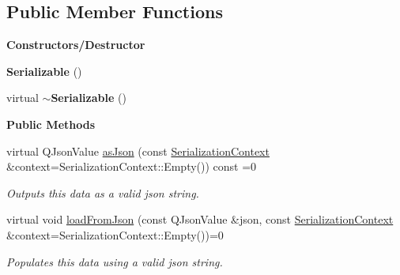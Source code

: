 \subsection*{Public Member Functions}
\begin{Indent}\textbf{ Constructors/\+Destructor}\par
\begin{DoxyCompactItemize}
\item 
\mbox{\label{classrev_1_1_serializable_afd95beffb0785162421c04034372b161}} 
{\bfseries Serializable} ()
\item 
\mbox{\label{classrev_1_1_serializable_a48737a4d5df365ec741a5a304d6990d9}} 
virtual {\bfseries $\sim$\+Serializable} ()
\end{DoxyCompactItemize}
\end{Indent}
\begin{Indent}\textbf{ Public Methods}\par
\begin{DoxyCompactItemize}
\item 
\mbox{\label{classrev_1_1_serializable_a4da225872e71a667236cc83d35e66b70}} 
virtual Q\+Json\+Value \mbox{\hyperlink{classrev_1_1_serializable_a4da225872e71a667236cc83d35e66b70}{as\+Json}} (const \mbox{\hyperlink{structrev_1_1_serialization_context}{Serialization\+Context}} \&context=Serialization\+Context\+::\+Empty()) const =0
\begin{DoxyCompactList}\small\item\em Outputs this data as a valid json string. \end{DoxyCompactList}\item 
\mbox{\label{classrev_1_1_serializable_a12908f551d59c1a752d5a30c906c4891}} 
virtual void \mbox{\hyperlink{classrev_1_1_serializable_a12908f551d59c1a752d5a30c906c4891}{load\+From\+Json}} (const Q\+Json\+Value \&json, const \mbox{\hyperlink{structrev_1_1_serialization_context}{Serialization\+Context}} \&context=Serialization\+Context\+::\+Empty())=0
\begin{DoxyCompactList}\small\item\em Populates this data using a valid json string. \end{DoxyCompactList}\end{DoxyCompactItemize}
\end{Indent}
